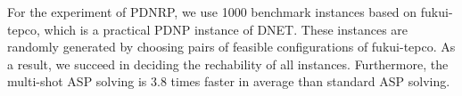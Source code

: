 \documentclass[dvipdfmx,a4paper]{jsarticle}
\begin{document}
For the experiment of PDNRP, we use 1000 benchmark instances based on
\textsf{fukui-tepco}, which is a practical PDNP instance of DNET.
%
These instances are randomly generated by choosing pairs of feasible
configurations of \textsf{fukui-tepco}.
%
As a result, we succeed in deciding the rechability of all instances.
%
Furthermore, the multi-shot ASP solving is 3.8 times faster in average
than standard ASP solving.

\end{document}
